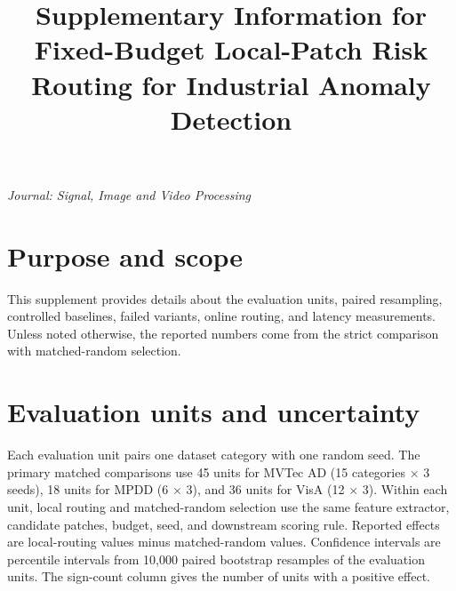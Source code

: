 \documentclass[pdflatex,sn-basic,Numbered]{sn-jnl}
\begin{document}
\title[Supplementary Information]{Supplementary Information for\\[0.35em] Fixed-Budget Local-Patch Risk Routing for Industrial Anomaly Detection}
\author*[1]{ }
\author[2]{ }

\maketitle

\begin{center}
\textit{Journal: Signal, Image and Video Processing}
\end{center}

\section{Purpose and scope}
This supplement provides details about the evaluation units, paired resampling, controlled baselines, failed variants, online routing, and latency measurements. Unless noted otherwise, the reported numbers come from the strict comparison with matched-random selection.

\section{Evaluation units and uncertainty}
Each evaluation unit pairs one dataset category with one random seed. The primary matched comparisons use 45 units for MVTec AD (15 categories $\times$ 3 seeds), 18 units for MPDD (6 $\times$ 3), and 36 units for VisA (12 $\times$ 3). Within each unit, local routing and matched-random selection use the same feature extractor, candidate patches, budget, seed, and downstream scoring rule. Reported effects are local-routing values minus matched-random values. Confidence intervals are percentile intervals from 10,000 paired bootstrap resamples of the evaluation units. The sign-count column gives the number of units with a positive effect.
\end{document}
